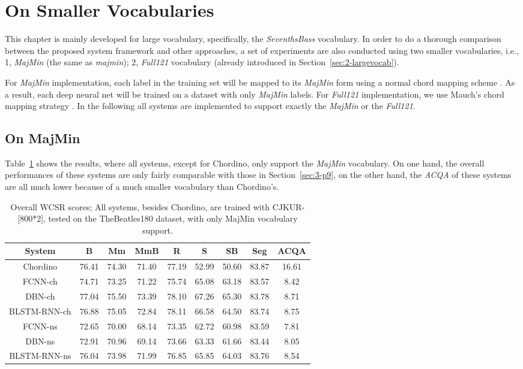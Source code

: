 \section{On Smaller Vocabularies}
This chapter is mainly developed for large vocabulary, specifically, the \textit{SeventhsBass} vocabulary. In order to do a thorough comparison between the proposed system framework and other approaches, a set of experiments are also conducted using two smaller vocabularies, i.e., 1, \textit{MajMin} (the same as \textit{majmin}); 2, \textit{Full121} vocabulary (already introduced in Section~\ref{sec:2-largevocab}).

For \textit{MajMin} implementation, each label in the training set will be mapped to its \textit{MajMin} form using a normal chord mapping scheme \cite{harte2010towards,pauwels2013evaluating}. As a result, each deep neural net will be trained on a dataset with only \textit{MajMin} labels. For \textit{Full121} implementation, we use Mauch's chord mapping strategy \cite{mauch2010automatic}. In the following all systems are implemented to support exactly the \textit{MajMin} or the \textit{Full121}.

\subsection{On MajMin}
Table~\ref{tab:3-overallres} shows the results, where all systems, except for Chordino, only support the \textit{MajMin} vocabulary. On one hand, the overall performances of these systems are only fairly comparable with those in Section~\ref{sec:3-p9}, on the other hand, the \textit{ACQA} of these systems are all much lower because of a much smaller vocabulary than Chordino's.
\begin{table}[h!]
\scriptsize
\centering
\caption{Overall WCSR scores; All systems, besides Chordino, are trained with CJKUR-[800*2], tested on the TheBeatles180 dataset, with only MajMin vocabulary support.}
\label{tab:3-overallres}
\begin{tabular}{|c|c|c|c|c|c|c|c|c|}\hline
System & B & Mm & MmB & R & S & SB & Seg & ACQA \\ \hline
Chordino & 76.41 & 74.30 & 71.40 & 77.19 & 52.99 & 50.60 & 83.87 & 16.61\\ \hline
FCNN-ch & 74.71 & 73.25 & 71.22 & 75.74 & 65.08 & 63.18 & 83.57 & 8.42\\ \hline
DBN-ch & 77.04 & 75.50 & 73.39 & 78.10 & 67.26 & 65.30 & 83.78 & 8.71\\ \hline
BLSTM-RNN-ch & 76.88 & 75.05 & 72.84 & 78.11 & 66.58 & 64.50 & 83.74 & 8.75\\ \hline
FCNN-ns & 72.65 & 70.00 & 68.14 & 73.35 & 62.72 & 60.98 & 83.59 & 7.81\\ \hline
DBN-ns & 72.91 & 70.96 & 69.14 & 73.66 & 63.33 & 61.66 & 83.44 & 8.05\\ \hline
BLSTM-RNN-ns & 76.04 & 73.98 & 71.99 & 76.85 & 65.85 & 64.03 & 83.76 & 8.54\\ \hline
\end{tabular}
\end{table}

